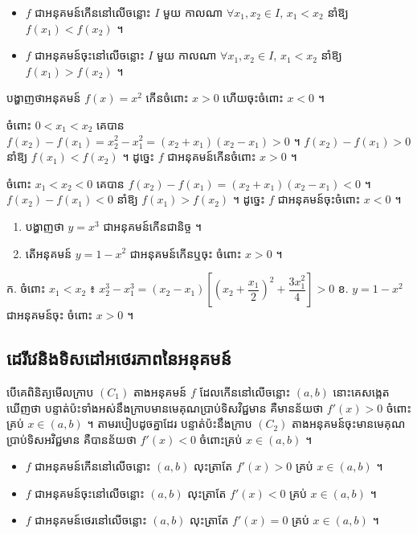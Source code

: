 \begin{itemize}
  \item $f$ ជាអនុគមន៍កើននៅលើចន្លោះ $I$ មួយ កាលណា $\forall x_1, x_2 \in I$, $x_1 < x_2$ នាំឱ្យ $f(x_1) < f(x_2)$ ។
  \item $f$ ជាអនុគមន៍ចុះនៅលើចន្លោះ $I$ មួយ កាលណា $\forall x_1, x_2 \in I$, $x_1 < x_2$ នាំឱ្យ $f(x_1) > f(x_2)$ ។
\end{itemize}

\begin{example}[លំហាត់គំរូ]
បង្ហាញថាអនុគមន៍ $f(x) = x^2$ កើនចំពោះ $x > 0$ ហើយចុះចំពោះ $x < 0$ ។
\end{example}
\ans
ចំពោះ $0 < x_1 < x_2$ គេបាន $f(x_2) - f(x_1) = x_2^2 - x_1^2 = (x_2 + x_1)(x_2 - x_1) > 0$ ។ $f(x_2) - f(x_1) > 0$ នាំឱ្យ $f(x_1) < f(x_2)$ ។ ដូច្នេះ $f$ ជាអនុគមន៍កើនចំពោះ $x > 0$ ។

ចំពោះ $x_1 < x_2 < 0$ គេបាន $f(x_2) - f(x_1) = (x_2 + x_1)(x_2 - x_1) < 0$ ។ $f(x_2) - f(x_1) < 0$ នាំឱ្យ $f(x_1) > f(x_2)$ ។ ដូច្នេះ $f$ ជាអនុគមន៍ចុះចំពោះ $x < 0$ ។

\begin{pro}
\begin{enumerate}[a]
  \item បង្ហាញថា $y = x^3$ ជាអនុគមន៍កើនជានិច្ច ។
  \item តើអនុគមន៍ $y = 1 - x^2$ ជាអនុគមន៍កើនឬចុះ ចំពោះ $x > 0$ ។
\end{enumerate}
\ans
ក. ចំពោះ $x_1 < x_2$ ៖ $x_2^3 - x_1^3 = (x_2 - x_1)\left[\left(x_2 + \dfrac{x_1}{2}\right)^2 + \dfrac{3x_1^2}{4}\right] > 0$ \quad ខ. $y = 1 - x^2$ ជាអនុគមន៍ចុះ ចំពោះ $x > 0$ ។
\end{pro}

\subsection{ដេរីវេនិងទិសដៅអថេរភាពនៃអនុគមន៍}

បើគេពិនិត្យមើលក្រាប $(C_1)$ តាងអនុគមន៍ $f$ ដែលកើននៅលើចន្លោះ $(a, b)$ នោះគេសង្កេតឃើញថា បន្ទាត់ប៉ះទាំងអស់នឹងក្រាបមានមេគុណប្រាប់ទិសវិជ្ជមាន គឺមានន័យថា $f'(x) > 0$ ចំពោះគ្រប់ $x \in (a, b)$ ។ តាមរបៀបដូចគ្នាដែរ បន្ទាត់ប៉ះនឹងក្រាប $(C_2)$ តាងអនុគមន៍ចុះមានមេគុណប្រាប់ទិសអវិជ្ជមាន គឺបានន័យថា $f'(x) < 0$ ចំពោះគ្រប់ $x \in (a, b)$ ។

\begin{formulaBox}[ជាទូទៅ]
\begin{itemize}
  \item $f$ ជាអនុគមន៍កើននៅលើចន្លោះ $(a, b)$ លុះត្រាតែ $f'(x) > 0$ គ្រប់ $x \in (a, b)$ ។
  \item $f$ ជាអនុគមន៍ចុះនៅលើចន្លោះ $(a, b)$ លុះត្រាតែ $f'(x) < 0$ គ្រប់ $x \in (a, b)$ ។
  \item $f$ ជាអនុគមន៍ថេរនៅលើចន្លោះ $(a, b)$ លុះត្រាតែ $f'(x) = 0$ គ្រប់ $x \in (a, b)$ ។
\end{itemize}
\end{formulaBox}

